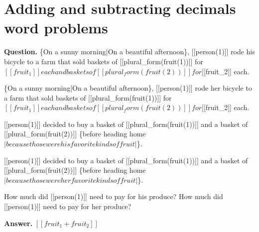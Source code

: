 \documentclass{article}
\begin{document}
\section*{Adding and subtracting decimals word problems}
\textbf{Question.} \{On a sunny morning|On a beautiful afternoon\}, [[person(1)]]
                    rode his bicycle to a farm that sold baskets of [[plural\_form(fruit(1))]] for $[[fruit_1]]
                    each and baskets of [[plural_form(fruit(2))]] for $[[fruit\_2]] each.
                
                    \{On a sunny morning|On a beautiful afternoon\}, [[person(1)]]
                    rode her bicycle to a farm that sold baskets of [[plural\_form(fruit(1))]] for $[[fruit_1]]
                    each and baskets of [[plural_form(fruit(2))]] for $[[fruit\_2]] each.
                
                
                    [[person(1)]] decided to buy a basket of [[plural\_form(fruit(1))]] and a basket of [[plural\_form(fruit(2))]] \{before heading home$| because those were his favorite kinds of fruit |$\}.
                
                    [[person(1)]] decided to buy a basket of [[plural\_form(fruit(1))]] and a basket of [[plural\_form(fruit(2))]] \{before heading home$| because those were her favorite kinds of fruit |$\}.
                
                How much did [[person(1)]] need to pay for his produce?
                How much did [[person(1)]] need to pay for her produce?

\textbf{Answer.} $[[fruit_1 + fruit_2]]$
\end{document}
